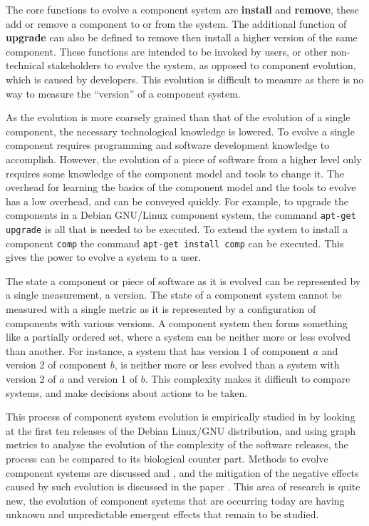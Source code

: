 The core functions to evolve a component system are \textbf{install} and \textbf{remove}, these add or remove a component to or from the system.
The additional function of \textbf{upgrade} can also be defined to remove then install a higher version of the same component. 
These functions are intended to be invoked by users, or other non-technical stakeholders to evolve the system,
as opposed to component evolution, which is caused by developers.
This evolution is difficult to measure as there is no way to measure the ``version'' of a component system.
 
As the evolution is more coarsely grained than that of the evolution of a single component, the necessary technological knowledge is lowered.
To evolve a single component requires programming and software development knowledge to accomplish.
However, the evolution of a piece of software from a higher level only requires some knowledge of the component model and tools to change it.
The overhead for learning the basics of the component model and the tools to evolve has a low overhead, and can be conveyed quickly.
For example, to upgrade the components in a Debian GNU/Linux component system, the command \verb+apt-get upgrade+ is all that is needed to be executed.
To extend the system to install a component \verb+comp+ the command \verb+apt-get install comp+ can be executed.
This gives the power to evolve a system to a user.

The state a component or piece of software as it is evolved can be represented by a single measurement, a version.
The state of a component system cannot be measured with a single metric as it is represented by a configuration of components with various versions.
A component system then forms something like a partially ordered set, where a system can be neither more or less evolved than another.
For instance, a system that has version 1 of component $a$ and version 2 of component $b$, is neither more or less evolved than a system with version 2 of $a$ and version 1 of $b$.
This complexity makes it difficult to compare systems, and make decisions about actions to be taken.

This process of component system evolution is empirically studied in \cite{fortuna2011} by looking at the first ten releases of the Debian Linux/GNU distribution,
and using graph metrics to analyse the evolution of the complexity of the software releases, the process can be compared to its biological counter part.
Methods to evolve component systems are discussed \cite{Ryan2005} and \cite{Luo2004},
and the mitigation of the negative effects caused by such evolution is discussed in the paper \cite{Stuckenholz2007}.
This area of research is quite new, the evolution of component systems that are occurring today are having unknown and unpredictable emergent effects that remain to be studied.

